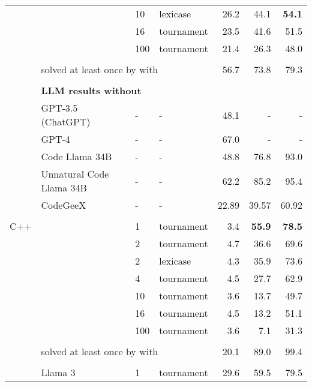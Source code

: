 \begin{table}[t]
\begin{adjustbox}{max width=\textwidth}
\begin{DIFnomarkup}
\begin{tabular}{llllrrr}
       &        & 10  &           lexicase &    26.2 &     44.1 &      \textbf{54.1} \\
       &        & 16  &         tournament &    23.5 &     41.6 &      51.5 \\
       &        & 100 &         tournament &    21.4 &     26.3 &      48.0  \\[1pt]
\cline{3-7}\\[-8pt]
       & \multicolumn{3}{l}{solved at least once by \method{} with \llama{}} & 56.7 &     73.8 &      79.3 \\[1pt]
\cline{2-7}\\[-8pt]
& \multicolumn{6}{l}{\textbf{LLM results without \method{}}} \\
 & GPT-3.5 (ChatGPT) & - &  - &  48.1  &  -   &    - \\
 & GPT-4 & - &  - & 67.0   &  -   &    - \\
 & Code Llama 34B & - &  - &  48.8  &  76.8   &    93.0 \\
 & Unnatural Code Llama 34B & - &  - &  62.2  &  85.2   &    95.4 \\
 & CodeGeeX & - &  - &  22.89  &  39.57   &    60.92 \\[-2pt]
\midrule\\[-10pt]
C++    & \gpt{} & 1   &         tournament &     3.4 &    \textbf{ 55.9} &      \textbf{78.5} \\
       &        & 2   &         tournament &     4.7 &     36.6 &      69.6 \\
       &        & 2   &           lexicase &     4.3 &     35.9 &      73.6 \\
       &        & 4   &         tournament &     4.5 &     27.7 &      62.9 \\
       &        & 10  &         tournament &     3.6 &     13.7 &      49.7 \\
       &        & 16  &         tournament &     4.5 &     13.2 &      51.1 \\
       &        & 100 &         tournament &     3.6 &      7.1 &      31.3 \\[1pt]
\cline{3-7}\\[-8pt]
       & \multicolumn{3}{l}{solved at least once by \method{} with \gpt{}} & 20.1 &     89.0 &      99.4 \\[1pt]
\cline{2-7}\\[-8pt]
    &   Llama 3 & 1   &         tournament &    29.6 &     59.5 &      79.5 \\

\end{tabular}
\end{DIFnomarkup}
\end{adjustbox}
\end{table}
